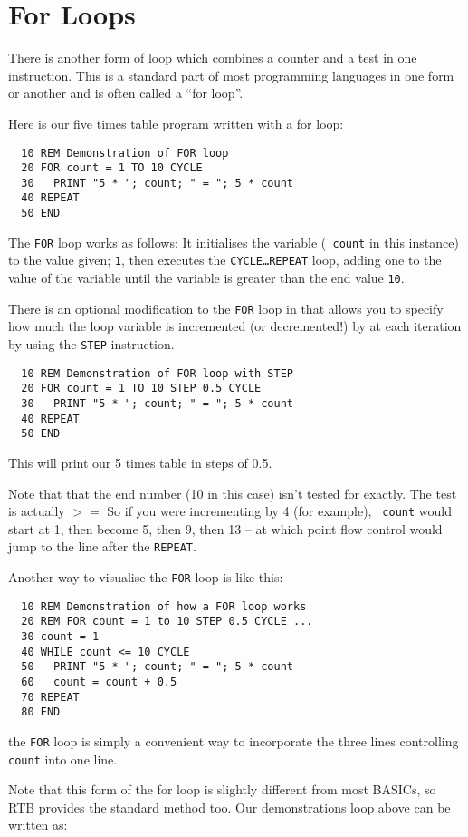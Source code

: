 \section{For Loops}
There is another form of loop which combines a counter and a test in
one instruction. This is a standard part of most programming languages
in one form or another and is often called a ``for loop''.

\noindent
Here is our five times table program written with a for loop:
\begin{verbatim}
  10 REM Demonstration of FOR loop
  20 FOR count = 1 TO 10 CYCLE
  30   PRINT "5 * "; count; " = "; 5 * count
  40 REPEAT
  50 END
\end{verbatim}
The {\tt FOR} loop works as follows: It initialises the variable ({\tt
count} in this instance) to the value given; {\tt 1}, then executes the
{\tt CYCLE\dots REPEAT} loop, adding one to the value of the variable until
the variable is greater than the end value {\tt 10}.

There is an optional modification to the {\tt FOR} loop in that allows you
to specify how much the loop variable is incremented (or decremented!) by
at each iteration by using the {\tt STEP} instruction.
\begin{verbatim}
  10 REM Demonstration of FOR loop with STEP
  20 FOR count = 1 TO 10 STEP 0.5 CYCLE
  30   PRINT "5 * "; count; " = "; 5 * count
  40 REPEAT
  50 END
\end{verbatim}
This will print our 5 times table in steps of 0.5.

Note that that the end number (10 in this case) isn't tested for exactly. The
test is actually $>=$ So if you were incrementing by 4 (for example), {\tt
count} would start at 1, then become 5, then 9, then 13 -- at which point
flow control would jump to the line after the {\tt REPEAT}.

\noindent
Another way to visualise the {\tt FOR} loop is like this:
\begin{verbatim}
  10 REM Demonstration of how a FOR loop works
  20 REM FOR count = 1 to 10 STEP 0.5 CYCLE ...
  30 count = 1
  40 WHILE count <= 10 CYCLE
  50   PRINT "5 * "; count; " = "; 5 * count
  60   count = count + 0.5
  70 REPEAT
  80 END
\end{verbatim}
the {\tt FOR} loop is simply a convenient way to incorporate the three
lines controlling {\tt count} into one line.

Note \meek that this form of the for loop is slightly different from most BASICs,
so RTB provides the standard method too. Our demonstrations loop above can
be written as:

